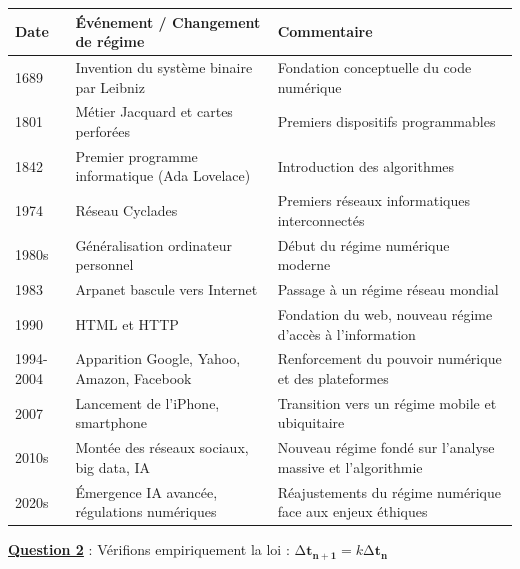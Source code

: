 \documentclass[12pt, a4paper]{article}
\newcommand{\question}[1]{\textbf{\underline{Question #1}}}
\begin{document}
\begin{enumerate}[label=\textbf{\arabic*.}, start=3]
		\begin{tabular}{|p{2cm}|p{5cm}|p{5cm}|}
			\hline
			\textbf{Date} & \textbf{Événement / Changement de régime} & \textbf{Commentaire} \\
			\hline
			1689 & Invention du système binaire par Leibniz & Fondation conceptuelle du code numérique \\
			\hline
			1801 & Métier Jacquard et cartes perforées & Premiers dispositifs programmables \\
			\hline
			1842 & Premier programme informatique (Ada Lovelace) & Introduction des algorithmes \\
			\hline
			1974 & Réseau Cyclades & Premiers réseaux informatiques interconnectés \\
			\hline
			1980s & Généralisation ordinateur personnel & Début du régime numérique moderne \\
			\hline
			1983 & Arpanet bascule vers Internet & Passage à un régime réseau mondial \\
			\hline
			1990 & HTML et HTTP & Fondation du web, nouveau régime d'accès à l'information \\
			\hline
			1994-2004 & Apparition Google, Yahoo, Amazon, Facebook & Renforcement du pouvoir numérique et des plateformes \\
			\hline
			2007 & Lancement de l'iPhone, smartphone & Transition vers un régime mobile et ubiquitaire \\
			\hline
			2010s & Montée des réseaux sociaux, big data, IA & Nouveau régime fondé sur l'analyse massive et l'algorithmie \\
			\hline
			2020s & Émergence IA avancée, régulations numériques & Réajustements du régime numérique face aux enjeux éthiques \\
			\hline
		\end{tabular}
		
		\question{2} : Vérifions empiriquement la loi : $\mathbf{\mathrm{\Delta}}\mathbf{t}_{\mathbf{n + 1}} = k\mathrm{\Delta}\mathbf{t}_{\mathbf{n}}$
		

\end{enumerate}
\end{document}
